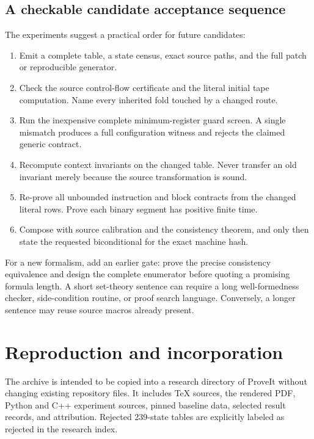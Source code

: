 \documentclass[11pt,a4paper]{article}
\theoremstyle{definition}
\begin{document}
\subsection{A checkable candidate acceptance sequence}

The experiments suggest a practical order for future candidates:
\begin{enumerate}
\item Emit a complete table, a state census, exact source paths, and the
full patch or reproducible generator.
\item Check the source control-flow certificate and the literal initial
tape computation.  Name every inherited fold touched by a changed route.
\item Run the inexpensive complete minimum-register guard screen.  A
single mismatch produces a full configuration witness and rejects the
claimed generic contract.
\item Recompute context invariants on the changed table.  Never transfer
an old invariant merely because the source transformation is sound.
\item Re-prove all unbounded instruction and block contracts from the
changed literal rows.  Prove each binary segment has positive finite time.
\item Compose with source calibration and the consistency theorem, and
only then state the requested biconditional for the exact machine hash.
\end{enumerate}

For a new formalism, add an earlier gate: prove the precise consistency
equivalence and design the complete enumerator before quoting a promising
formula length.  A short set-theory sentence can require a long
well-formedness checker, side-condition routine, or proof search language.
Conversely, a longer sentence may reuse source macros already present.

\section{Reproduction and incorporation}
\label{sec:reproduce}

The archive is intended to be copied into a research directory of ProveIt
without changing existing repository files.  It includes TeX sources,
the rendered PDF, Python and C++ experiment sources, pinned baseline
data, selected result records, and attribution.  Rejected 239-state
tables are explicitly labeled as rejected in the research index.
\end{document}
